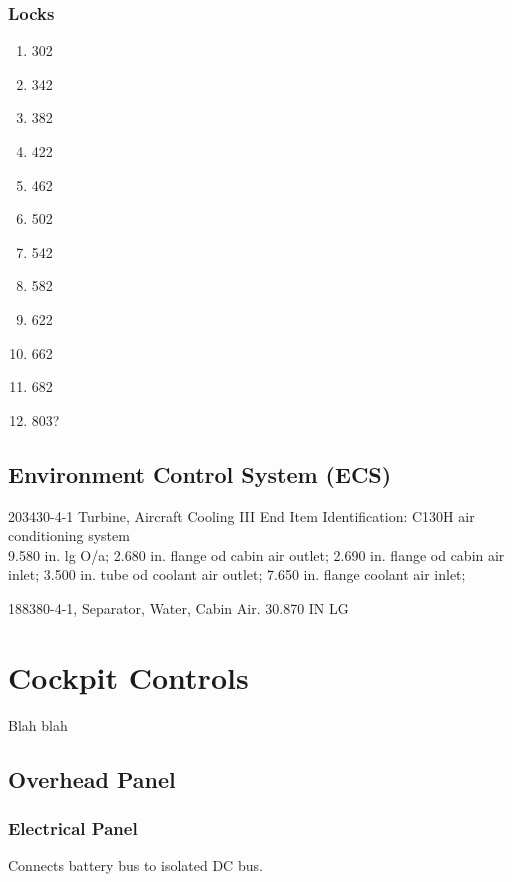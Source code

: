 \subsection{Locks}

\begin{enumerate}
  \item 302
  \item 342
  \item 382
  \item 422
  \item 462
  \item 502
  \item 542
  \item 582
  \item 622
  \item 662
  \item 682
  \item 803?
\end{enumerate}


\section{Environment Control System (ECS)}
203430-4-1 Turbine, Aircraft Cooling III End Item Identification: C130H air conditioning system\\
9.580 in. lg O/a;
2.680 in. flange od cabin air outlet;
2.690 in. flange od cabin air inlet;
3.500 in. tube od coolant air outlet;
7.650 in. flange coolant air inlet;

188380-4-1, Separator, Water, Cabin Air. 30.870 IN LG

\chapter{Cockpit Controls}

Blah blah

\section{Overhead Panel}

\subsection{Electrical Panel}

\begin{enumerate}
   Connects battery bus to isolated DC bus.
\end{enumerate}

